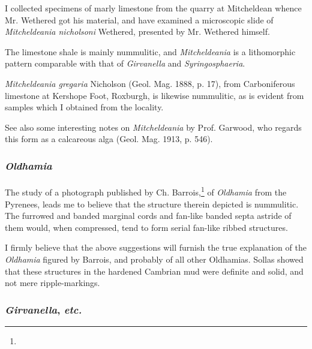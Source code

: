 \documentclass[a4paper, 12pt, oneside]{article}
\begin{document}
I collected specimens of marly limestone from the quarry at Mitcheldean whence Mr. Wethered got his material, and have examined a microscopic slide of \emph{Mitcheldeania nicholsoni} Wethered, presented by Mr. Wethered himself.

The limestone shale is mainly nummulitic, and \emph{Mitcheldeania} is a lithomorphic pattern comparable with that of \emph{Girvanella} and \emph{Syringosphaeria}.

\emph{Mitcheldeania gregaria} Nicholson (Geol. Mag. 1888, p. 17), from Carboniferous limestone at Kershope Foot, Roxburgh, is likewise nummulitic, as is evident from samples which I obtained from the locality.

See also some interesting notes on \emph{Mitcheldeania} by Prof. Garwood, who regards this form as a calcareous alga (Geol. Mag. 1913, p. 546).

\subsubsection{\emph{Oldhamia}}
\paragraph{}
The study of a photograph published by Ch. Barrois,\footnote{} of \emph{Oldhamia} from the Pyrenees, leads me to believe that the structure therein depicted is nummulitic. The furrowed and banded marginal cords and fan-like banded septa astride of them would, when compressed, tend to form serial fan-like ribbed structures.

I firmly believe that the above suggestions will furnish the true explanation of the \emph{Oldhamia} figured by Barrois, and probably of all other Oldhamias. Sollas showed that these structures in the hardened Cambrian mud were definite and solid, and not mere ripple-markings.

\subsubsection{\emph{Girvanella}, \emph{etc.}}
\end{document}
